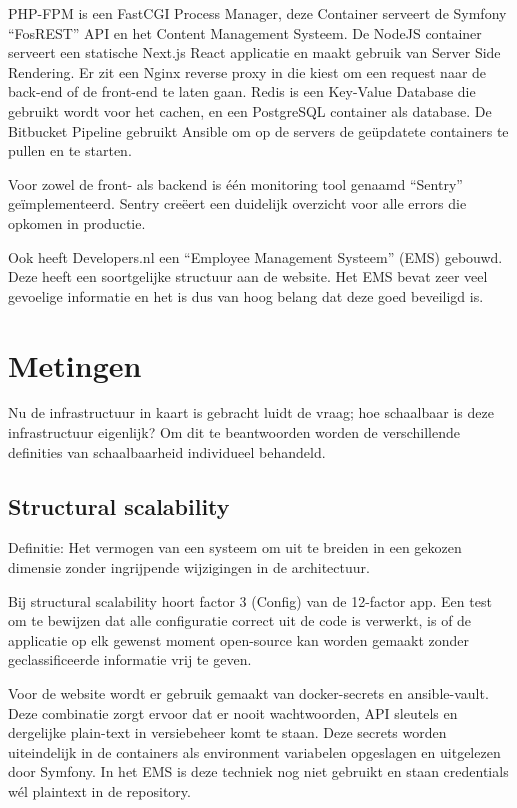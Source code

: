 PHP-FPM is een FastCGI Process Manager, deze Container serveert de Symfony “FosREST” API en het Content Management Systeem. De NodeJS container serveert een statische Next.js React applicatie en maakt gebruik van Server Side Rendering. Er zit een Nginx reverse proxy in die kiest om een request naar de back-end of de front-end te laten gaan. Redis is een Key-Value Database die gebruikt wordt voor het cachen, en een PostgreSQL container als database. De Bitbucket Pipeline gebruikt Ansible om op de servers de geüpdatete containers te pullen en te starten.

Voor zowel de front- als backend is één monitoring tool genaamd \enquote{Sentry} geïmplementeerd. Sentry creëert een duidelijk overzicht voor alle errors die opkomen in productie.

Ook heeft Developers.nl een \enquote{Employee Management Systeem} (EMS) gebouwd. Deze heeft een soortgelijke structuur aan de website. Het EMS bevat zeer veel gevoelige informatie en het is dus van hoog belang dat deze goed beveiligd is.

\section{Metingen}

Nu de infrastructuur in kaart is gebracht luidt de vraag; hoe schaalbaar is deze infrastructuur eigenlijk? Om dit te beantwoorden worden de verschillende definities van schaalbaarheid individueel behandeld.

\subsection{Structural scalability}
Definitie: Het vermogen van een systeem om uit te breiden in een gekozen dimensie zonder ingrijpende wijzigingen in de architectuur.

Bij structural scalability hoort factor 3 (Config) van de 12-factor app. Een test om te bewijzen dat alle configuratie correct uit de code is verwerkt, is of de applicatie op elk gewenst moment open-source kan worden gemaakt zonder geclassificeerde informatie vrij te geven.

Voor de website wordt er gebruik gemaakt van docker-secrets en ansible-vault. Deze combinatie zorgt ervoor dat er nooit wachtwoorden, API sleutels en dergelijke plain-text in versiebeheer komt te staan. Deze secrets worden uiteindelijk in de containers als environment variabelen opgeslagen en uitgelezen door Symfony. In het EMS is deze techniek nog niet gebruikt en staan credentials wél plaintext in de repository.

